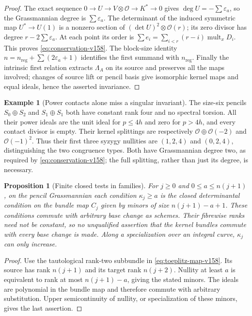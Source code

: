 \documentclass[11pt,reqno]{amsart}
\numberwithin{equation}{section}
\newtheorem{proposition}[theorem]{Proposition}
\theoremstyle{definition}\newtheorem{definition}[theorem]{Definition}
\newtheorem{example}[theorem]{Example}
\theoremstyle{remark}\newtheorem{remark}[theorem]{Remark}
\newcommand{\OO}{\mathcal O}\newcommand{\II}{\mathcal I}
\begin{document}
\begin{proof}
The exact sequence $0\to U\to V\otimes\OO\to K^*\to0$ gives
$\deg U=-\sum\varepsilon_a$, so the Grassmannian degree is
$\sum\varepsilon_a$. The determinant of the induced symmetric map
$U^*\to U(1)$ is a nonzero section of
$(\det U)^2\otimes\OO(r)$; its zero divisor has degree
$r-2\sum\varepsilon_a$. At each point its order is
$\sum e_i=\sum_{i<r}(r-i)\operatorname{mult}_xD_i$.
This proves \eqref{eq:conservation-v158}. The block-size identity
$n=n_{\mathrm{reg}}+\sum(2\varepsilon_a+1)$ identifies the first
summand with $n_{\mathrm{reg}}$. Finally the intrinsic first relation
extracts $\Lambda_A$ on its source and preserves all the maps involved;
changes of source lift or pencil basis give isomorphic kernel maps
and equal ideals, hence the asserted invariance.
\end{proof}

\begin{example}[Power contacts alone miss a singular invariant]
\label{ex:singular-separation-v158}
The size-six pencils $S_0\oplus S_2$ and $S_1\oplus S_1$ both have
constant rank four and no spectral torsion. All their power ideals
are the unit ideal for $p\leq4h$ and zero for $p>4h$, and every
contact divisor is empty. Their kernel splittings are respectively
$\OO\oplus\OO(-2)$ and $\OO(-1)^2$. Thus their first three
syzygy nullities are $(1,2,4)$ and $(0,2,4)$, distinguishing the two
congruence types. Both have Grassmannian degree two, as required by
\eqref{eq:conservation-v158}; the full splitting, rather than just
its degree, is necessary.
\end{example}

\begin{proposition}[Finite closed tests in families]
\label{prop:syzygy-family-v158}
For $j\geq0$ and $0\leq a\leq n(j+1)$, on the pencil
Grassmannian each condition $\kappa_j\geq a$ is the
closed determinantal condition on the bundle map $C_j$ given by minors
of size $n(j+1)-a+1$. These conditions commute with arbitrary base
change as schemes. Their fibrewise ranks need not be constant, so no
unqualified assertion that the kernel bundles commute with every
base change is made. Along a specialization over an integral curve,
$\kappa_j$ can only increase.
\end{proposition}
\begin{proof}
Use the tautological rank-two subbundle in
\eqref{eq:toeplitz-map-v158}. Its source has rank $n(j+1)$ and its
target rank $n(j+2)$. Nullity at least $a$ is equivalent to rank at
most $n(j+1)-a$, giving the stated minors. The ideals are polynomial
in the bundle map and therefore commute with arbitrary substitution.
Upper semicontinuity of nullity, or specialization of these minors,
gives the last assertion.
\end{proof}
\end{document}
